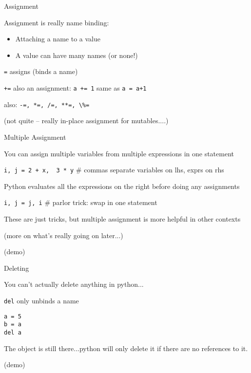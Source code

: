 \documentclass{beamer}
\begin{document}
\begin{frame}[fragile]{Assignment}

{\Large Assignment is really name binding: }
\begin{itemize}
  \item Attaching a name to a value
  \item A value can have many names (or none!)
\end{itemize}

\vfill
{\large \verb|=| assigns (binds a name)}

\vfill
{\large \verb|+=| also an assignment: \verb|a += 1| same as \verb|a = a+1|}

\hspace{0.1in}also: \verb|-=, *=, /=, **=, \%=|

(not quite -- really in-place assignment for mutables....)

\end{frame}


\begin{frame}[fragile]{Multiple Assignment}

{\large You can assign multiple variables from multiple expressions in one statement}

\vfill
\verb|i, j = 2 + x,  3 * y| \# commas separate variables on lhs, exprs on rhs

\vfill
{\large Python evaluates all the expressions on the right before doing any assignments}

\vfill
\verb|i, j = j, i| \# parlor trick: swap in one statement

\vfill
\large{These are just tricks, but multiple assignment is more helpful in other contexts}

\vfill
(more on what's really going on later...)

\vfill
(demo)
\end{frame}


\begin{frame}[fragile]{Deleting}

{\large You can't actually delete anything in python...}

\vfill

{\large \verb|del| only unbinds a name}

\vfill
\begin{verbatim}
a = 5
b = a
del a
\end{verbatim}

The object is still there...python will only delete it if there are no references to it.

\vfill
(demo)

\end{frame}
\end{document}
